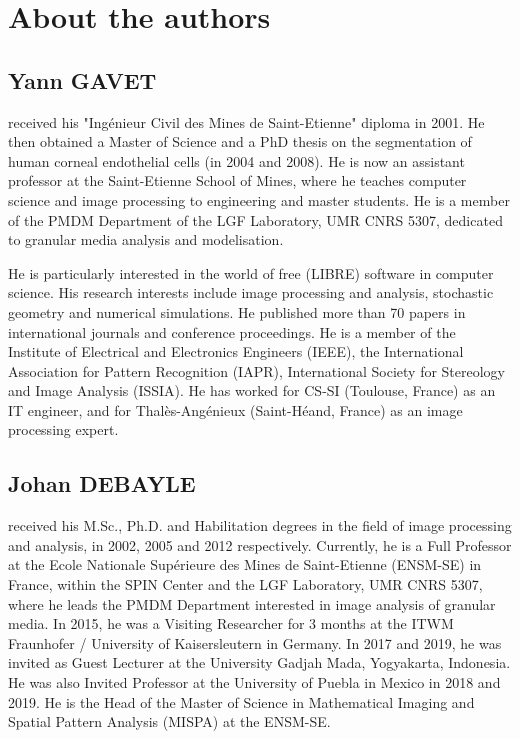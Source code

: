\section*{About the authors}
\subsection*{Yann GAVET}

received his "Ingénieur Civil des Mines de Saint-Etienne" diploma in 2001. He then obtained a Master of Science and a PhD thesis on the segmentation of human corneal endothelial cells (in 2004 and 2008). He is now an assistant professor at the Saint-Etienne School of Mines, where he teaches computer science and image processing to engineering and master students. He is a member of the PMDM Department of the LGF Laboratory, UMR CNRS 5307, dedicated to granular media analysis and modelisation.

He is particularly interested in the world of free (LIBRE) software in computer science. His research interests include image processing and analysis, stochastic geometry and numerical simulations. He published more than 70 papers in international journals and conference proceedings. He is a member of the Institute of Electrical and Electronics Engineers (IEEE), the International Association for Pattern Recognition (IAPR), International Society for Stereology and Image Analysis (ISSIA). He has worked for CS-SI (Toulouse, France) as an IT engineer, and for Thalès-Angénieux (Saint-Héand, France) as an image processing expert.

\subsection*{Johan DEBAYLE} 

received his M.Sc., Ph.D. and Habilitation degrees in the field of image processing and analysis, in 2002, 2005 and 2012 respectively. Currently, he is a Full Professor at the Ecole Nationale Supérieure des Mines de Saint-Etienne (ENSM-SE) in France, within the SPIN Center and the LGF Laboratory, UMR CNRS 5307, where he leads the PMDM Department interested in image analysis of granular media. In 2015, he was a Visiting Researcher for 3 months at the ITWM Fraunhofer / University of Kaisersleutern in Germany. In 2017 and 2019, he was invited as Guest Lecturer at the University Gadjah Mada, Yogyakarta, Indonesia. He was also Invited Professor at the University of Puebla in Mexico in 2018 and 2019. He is the Head of the Master of Science in Mathematical Imaging and Spatial Pattern Analysis (MISPA) at the ENSM-SE.

